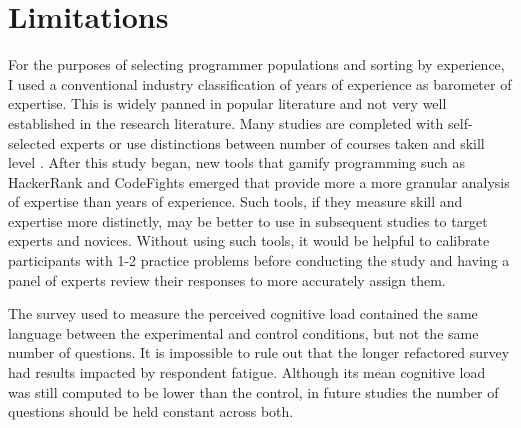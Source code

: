 \chapter{Limitations}

For the purposes of selecting programmer populations and sorting by experience, I used a conventional industry classification of years of experience \cite{Carlson2014} as barometer of expertise. This is widely panned in popular literature \cite{Atwood2008} and not very well established in the research literature. Many studies are completed with self-selected experts \cite{Mastaglio1991} or use distinctions between number of courses taken and skill level \cite{Soloway1984}. After this study began, new tools that gamify programming such as HackerRank and CodeFights emerged that provide more a more granular analysis of expertise than years of experience. Such tools, if they measure skill and expertise more distinctly, may be better to use in subsequent studies to target experts and novices. Without using such tools, it would be helpful to calibrate participants with 1-2  practice problems before conducting the study and having a panel of experts review their responses to more accurately assign them.

The survey used to measure the perceived cognitive load contained the same language between the experimental and control conditions, but not the same number of questions. It is impossible to rule out that the longer refactored survey had results impacted by respondent fatigue. Although its mean cognitive load was still computed to be lower than the control, in future studies the number of questions should be held constant across both. 
